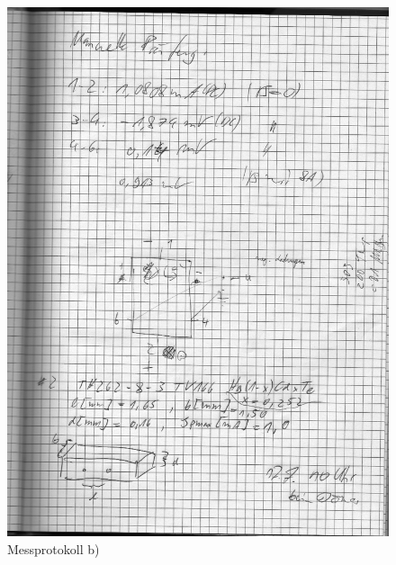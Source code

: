 \begin{figure}
 \centering
 \includegraphics[width=\textwidth]{../data/02.png}
 \caption{Messprotokoll b)}
\end{figure}


